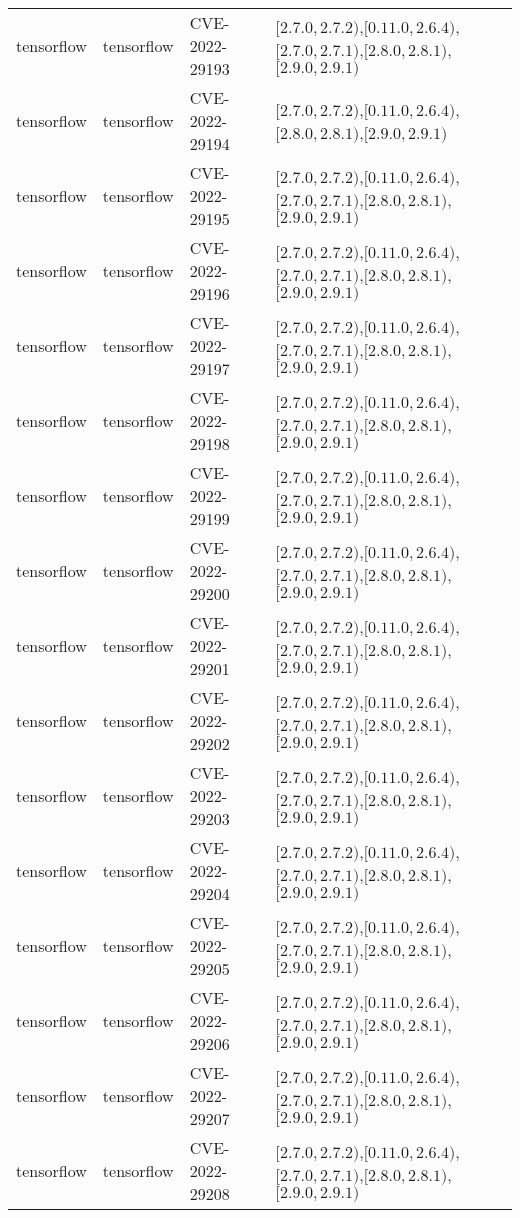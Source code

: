 \begin{tabular}{llll}
tensorflow & tensorflow & CVE-2022-29193 & $[2.7.0,2.7.2)$,$[0.11.0,2.6.4)$,$[2.7.0,2.7.1)$,$[2.8.0,2.8.1)$,$[2.9.0,2.9.1)$ \\
tensorflow & tensorflow & CVE-2022-29194 & $[2.7.0,2.7.2)$,$[0.11.0,2.6.4)$,$[2.8.0,2.8.1)$,$[2.9.0,2.9.1)$ \\
tensorflow & tensorflow & CVE-2022-29195 & $[2.7.0,2.7.2)$,$[0.11.0,2.6.4)$,$[2.7.0,2.7.1)$,$[2.8.0,2.8.1)$,$[2.9.0,2.9.1)$ \\
tensorflow & tensorflow & CVE-2022-29196 & $[2.7.0,2.7.2)$,$[0.11.0,2.6.4)$,$[2.7.0,2.7.1)$,$[2.8.0,2.8.1)$,$[2.9.0,2.9.1)$ \\
tensorflow & tensorflow & CVE-2022-29197 & $[2.7.0,2.7.2)$,$[0.11.0,2.6.4)$,$[2.7.0,2.7.1)$,$[2.8.0,2.8.1)$,$[2.9.0,2.9.1)$ \\
tensorflow & tensorflow & CVE-2022-29198 & $[2.7.0,2.7.2)$,$[0.11.0,2.6.4)$,$[2.7.0,2.7.1)$,$[2.8.0,2.8.1)$,$[2.9.0,2.9.1)$ \\
tensorflow & tensorflow & CVE-2022-29199 & $[2.7.0,2.7.2)$,$[0.11.0,2.6.4)$,$[2.7.0,2.7.1)$,$[2.8.0,2.8.1)$,$[2.9.0,2.9.1)$ \\
tensorflow & tensorflow & CVE-2022-29200 & $[2.7.0,2.7.2)$,$[0.11.0,2.6.4)$,$[2.7.0,2.7.1)$,$[2.8.0,2.8.1)$,$[2.9.0,2.9.1)$ \\
tensorflow & tensorflow & CVE-2022-29201 & $[2.7.0,2.7.2)$,$[0.11.0,2.6.4)$,$[2.7.0,2.7.1)$,$[2.8.0,2.8.1)$,$[2.9.0,2.9.1)$ \\
tensorflow & tensorflow & CVE-2022-29202 & $[2.7.0,2.7.2)$,$[0.11.0,2.6.4)$,$[2.7.0,2.7.1)$,$[2.8.0,2.8.1)$,$[2.9.0,2.9.1)$ \\
tensorflow & tensorflow & CVE-2022-29203 & $[2.7.0,2.7.2)$,$[0.11.0,2.6.4)$,$[2.7.0,2.7.1)$,$[2.8.0,2.8.1)$,$[2.9.0,2.9.1)$ \\
tensorflow & tensorflow & CVE-2022-29204 & $[2.7.0,2.7.2)$,$[0.11.0,2.6.4)$,$[2.7.0,2.7.1)$,$[2.8.0,2.8.1)$,$[2.9.0,2.9.1)$ \\
tensorflow & tensorflow & CVE-2022-29205 & $[2.7.0,2.7.2)$,$[0.11.0,2.6.4)$,$[2.7.0,2.7.1)$,$[2.8.0,2.8.1)$,$[2.9.0,2.9.1)$ \\
tensorflow & tensorflow & CVE-2022-29206 & $[2.7.0,2.7.2)$,$[0.11.0,2.6.4)$,$[2.7.0,2.7.1)$,$[2.8.0,2.8.1)$,$[2.9.0,2.9.1)$ \\
tensorflow & tensorflow & CVE-2022-29207 & $[2.7.0,2.7.2)$,$[0.11.0,2.6.4)$,$[2.7.0,2.7.1)$,$[2.8.0,2.8.1)$,$[2.9.0,2.9.1)$ \\
tensorflow & tensorflow & CVE-2022-29208 & $[2.7.0,2.7.2)$,$[0.11.0,2.6.4)$,$[2.7.0,2.7.1)$,$[2.8.0,2.8.1)$,$[2.9.0,2.9.1)$ \\

\end{tabular}
